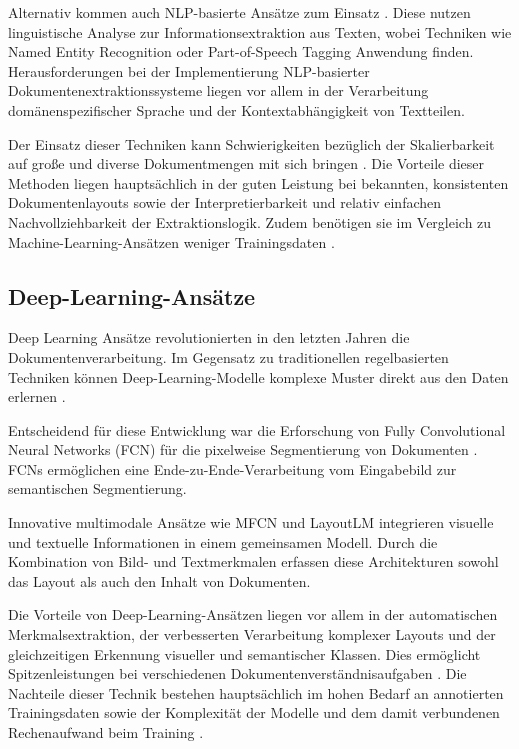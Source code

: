 Alternativ kommen auch NLP-basierte Ansätze zum Einsatz \cite{ChowdhuryGobindaG.1999Tmfi, MarinaiS.2005Annf}. Diese nutzen linguistische Analyse zur Informationsextraktion aus Texten, wobei Techniken wie Named Entity Recognition oder Part-of-Speech Tagging Anwendung finden. Herausforderungen bei der Implementierung NLP-basierter Dokumentenextraktionssysteme liegen vor allem in der Verarbeitung domänenspezifischer Sprache und der Kontextabhängigkeit von Textteilen.

Der Einsatz dieser Techniken kann Schwierigkeiten bezüglich der Skalierbarkeit auf große und diverse Dokumentmengen mit sich bringen \cite{ChowdhuryGobindaG.1999Tmfi, YeYibin2018Auso}. Die Vorteile dieser Methoden liegen hauptsächlich in der guten Leistung bei bekannten, konsistenten Dokumentenlayouts sowie der Interpretierbarkeit und relativ einfachen Nachvollziehbarkeit der Extraktionslogik. Zudem benötigen sie im Vergleich zu Machine-Learning-Ansätzen weniger Trainingsdaten \cite{ChowdhuryGobindaG.1999Tmfi, MarinaiS.2005Annf}.

\subsection{Deep-Learning-Ansätze}
\label{subsec:deep-learning-ansätze}

Deep Learning Ansätze revolutionierten in den letzten Jahren die Dokumentenverarbeitung. Im Gegensatz zu traditionellen regelbasierten Techniken können Deep-Learning-Modelle komplexe Muster direkt aus den Daten erlernen \cite{YangXiao2017LtES, XuYiheng2020LPoT}.

Entscheidend für diese Entwicklung war die Erforschung von Fully Convolutional Neural Networks (FCN) für die pixelweise Segmentierung von Dokumenten \cite{YangXiao2017LtES}. FCNs ermöglichen eine Ende-zu-Ende-Verarbeitung vom Eingabebild zur semantischen Segmentierung.

Innovative multimodale Ansätze wie MFCN\cite{YangXiao2017LtES} und LayoutLM\cite{XuYiheng2020LPoT} integrieren visuelle und textuelle Informationen in einem gemeinsamen Modell. Durch die Kombination von Bild- und Textmerkmalen erfassen diese Architekturen sowohl das Layout als auch den Inhalt von Dokumenten.

Die Vorteile von Deep-Learning-Ansätzen liegen vor allem in der automatischen Merkmalsextraktion, der verbesserten Verarbeitung komplexer Layouts und der gleichzeitigen Erkennung visueller und semantischer Klassen. Dies ermöglicht Spitzenleistungen bei verschiedenen Dokumentenverständnisaufgaben \cite{YangXiao2017LtES, XuYiheng2020LPoT}. Die Nachteile dieser Technik bestehen hauptsächlich im hohen Bedarf an annotierten Trainingsdaten sowie der Komplexität der Modelle und dem damit verbundenen Rechenaufwand beim Training \cite{YangXiao2017LtES, XuYiheng2020LPoT}.

